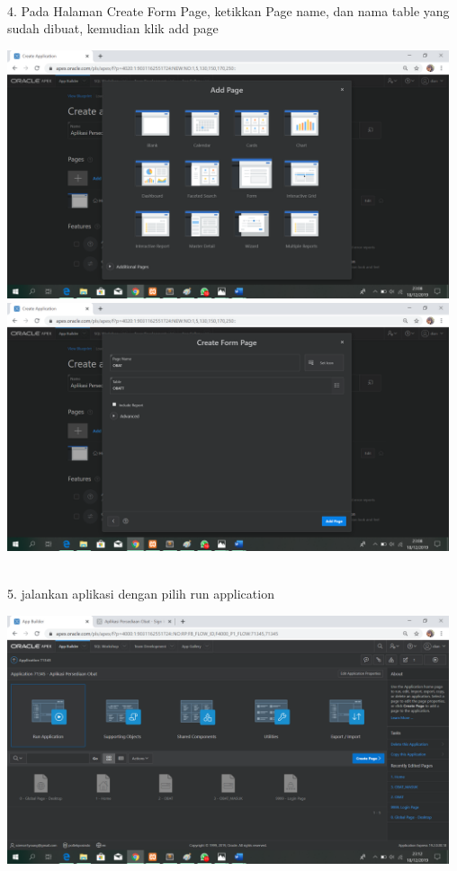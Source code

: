 \documentclass{article}
\begin{document}
\\
4. Pada Halaman Create Form Page, ketikkan Page name, dan nama table yang sudah dibuat, kemudian klik add page
\begin{center}
    \includegraphics[width=13cm]{figure/4.png}
    \includegraphics[width=13cm]{figure/5.png}
\end{center}
\\
5. jalankan aplikasi dengan pilih run application
\begin{center}
    \includegraphics[width=13cm]{figure/7.png}
\end{center}
\end{document}
